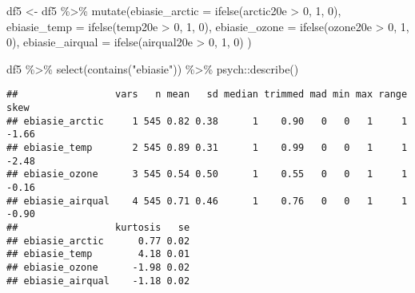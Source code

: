 \documentclass[
]{article}
\newenvironment{Shaded}{\begin{snugshade}}{\end{snugshade}}
\newcommand{\AttributeTok}[1]{\textcolor[rgb]{0.77,0.63,0.00}{#1}}
\newcommand{\DecValTok}[1]{\textcolor[rgb]{0.00,0.00,0.81}{#1}}
\newcommand{\FunctionTok}[1]{\textcolor[rgb]{0.00,0.00,0.00}{#1}}
\newcommand{\NormalTok}[1]{#1}
\newcommand{\OtherTok}[1]{\textcolor[rgb]{0.56,0.35,0.01}{#1}}
\newcommand{\SpecialCharTok}[1]{\textcolor[rgb]{0.00,0.00,0.00}{#1}}
\newcommand{\StringTok}[1]{\textcolor[rgb]{0.31,0.60,0.02}{#1}}
\begin{document}
\begin{Shaded}
\begin{Highlighting}[]
\NormalTok{df5 }\OtherTok{\textless{}{-}}\NormalTok{ df5 }\SpecialCharTok{\%\textgreater{}\%} 
  \FunctionTok{mutate}\NormalTok{(}\AttributeTok{ebiasie\_arctic =} \FunctionTok{ifelse}\NormalTok{(arctic20e }\SpecialCharTok{\textgreater{}} \DecValTok{0}\NormalTok{, }\DecValTok{1}\NormalTok{, }\DecValTok{0}\NormalTok{),}
         \AttributeTok{ebiasie\_temp =} \FunctionTok{ifelse}\NormalTok{(temp20e }\SpecialCharTok{\textgreater{}} \DecValTok{0}\NormalTok{, }\DecValTok{1}\NormalTok{, }\DecValTok{0}\NormalTok{),}
         \AttributeTok{ebiasie\_ozone =} \FunctionTok{ifelse}\NormalTok{(ozone20e }\SpecialCharTok{\textgreater{}} \DecValTok{0}\NormalTok{, }\DecValTok{1}\NormalTok{, }\DecValTok{0}\NormalTok{),}
         \AttributeTok{ebiasie\_airqual =} \FunctionTok{ifelse}\NormalTok{(airqual20e }\SpecialCharTok{\textgreater{}} \DecValTok{0}\NormalTok{, }\DecValTok{1}\NormalTok{, }\DecValTok{0}\NormalTok{)}
\NormalTok{  )}

\NormalTok{df5 }\SpecialCharTok{\%\textgreater{}\%} 
  \FunctionTok{select}\NormalTok{(}\FunctionTok{contains}\NormalTok{(}\StringTok{"ebiasie"}\NormalTok{)) }\SpecialCharTok{\%\textgreater{}\%} 
\NormalTok{  psych}\SpecialCharTok{::}\FunctionTok{describe}\NormalTok{()}
\end{Highlighting}
\end{Shaded}

\begin{verbatim}
##                 vars   n mean   sd median trimmed mad min max range  skew
## ebiasie_arctic     1 545 0.82 0.38      1    0.90   0   0   1     1 -1.66
## ebiasie_temp       2 545 0.89 0.31      1    0.99   0   0   1     1 -2.48
## ebiasie_ozone      3 545 0.54 0.50      1    0.55   0   0   1     1 -0.16
## ebiasie_airqual    4 545 0.71 0.46      1    0.76   0   0   1     1 -0.90
##                 kurtosis   se
## ebiasie_arctic      0.77 0.02
## ebiasie_temp        4.18 0.01
## ebiasie_ozone      -1.98 0.02
## ebiasie_airqual    -1.18 0.02
\end{verbatim}
\end{document}
